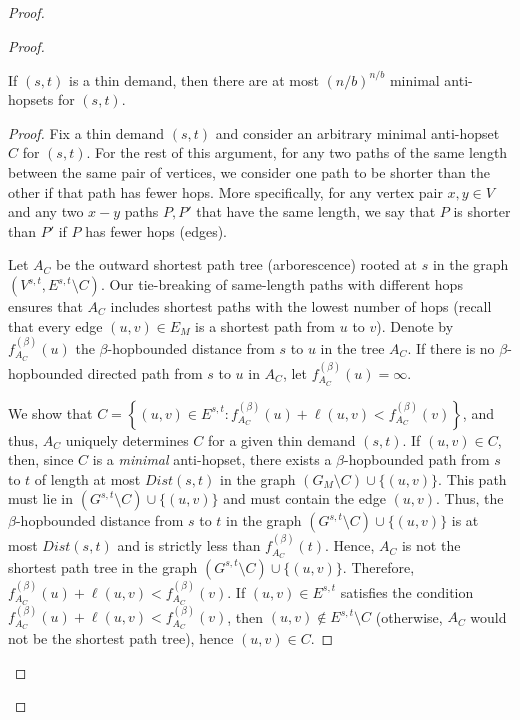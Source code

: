 \begin{proof}
\begin{proof}
        \begin{proposition} \label{prop:thin1}
            If $(s,t)$ is a thin demand, then there are at most $(n/b)^{n/b}$ minimal anti-hopsets for $(s,t)$.
        \end{proposition}
        \begin{proof}
            Fix a thin demand $(s,t)$ and consider an arbitrary minimal anti-hopset $C$ for $(s,t)$. For the rest of this argument, for any two paths of the same length between the same pair of vertices, we consider one path to be shorter than the other if that path has fewer hops. More specifically, for any vertex pair $x, y \in V$ and any two $x-y$ paths $P, P'$ that have the same length, we say that $P$ is shorter than $P'$ if $P$ has fewer hops (edges).
            
            Let $A_C$ be the outward shortest path tree (arborescence) rooted at $s$ in the graph $(V^{s,t}, E^{s,t} \setminus C)$. Our tie-breaking of same-length paths with different hops ensures that $A_C$ includes shortest paths with the lowest number of hops (recall that every edge $(u,v) \in E_M$ is a shortest path from $u$ to $v$). 
            Denote by $f^{(\beta)}_{A_C}(u)$ the $\beta$-hopbounded distance from $s$ to $u$ in the tree $A_C$. If there is no $\beta$-hopbounded directed path from $s$ to $u$ in $A_C$, let $f^{(\beta)}_{A_C}(u) = \infty$. 
            
            We show that $C = \left\{ (u,v) \in E^{s,t} : f^{(\beta)}_{A_C}(u) + \ell(u,v) <  f^{(\beta)}_{A_C}(v) \right\}$, and thus, $A_C$ uniquely determines $C$ for a given thin demand $(s,t)$. If $(u,v) \in C$, then, since $C$ is a \textit{minimal} anti-hopset, there exists a $\beta$-hopbounded path from $s$ to $t$ of length at most $Dist(s,t)$ in the graph $(G_M \setminus C) \cup \{(u,v)\}$. This path must lie in $(G^{s,t} \setminus C) \cup \{(u,v)\}$ and must contain the edge $(u,v)$. Thus, the $\beta$-hopbounded distance from $s$ to $t$ in the graph $(G^{s,t} \setminus C) \cup \{(u,v)\}$ is at most $Dist(s,t)$ and is strictly less than $f^{(\beta)}_{A_C}(t)$. Hence, $A_C$ is not the shortest path tree in the graph $(G^{s,t} \setminus C) \cup \{(u,v)\}$. Therefore, $f^{(\beta)}_{A_C}(u) + \ell(u,v) <  f^{(\beta)}_{A_C}(v)$. If $(u,v) \in E^{s,t}$ satisfies the condition $f^{(\beta)}_{A_C}(u) + \ell(u,v) <  f^{(\beta)}_{A_C}(v)$, then $(u,v) \notin E^{s,t} \setminus C$ (otherwise, $A_C$ would not be the shortest path tree), hence $(u,v) \in C$.


\end{proof}
\end{proof}
\end{proof}
